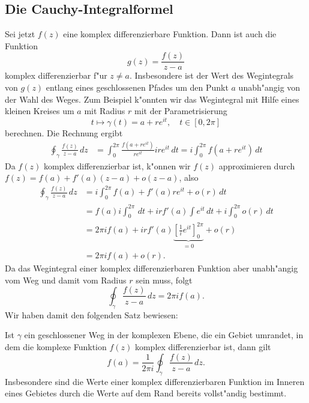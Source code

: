 \subsection{Die Cauchy-Integralformel}
Sei jetzt $f(z)$ eine komplex differenzierbare Funktion.
Dann ist auch die Funktion
\[
g(z)=\frac{f(z)}{z-a}
\]
komplex differenzierbar f"ur $z\ne a$.
Insbesondere ist der Wert des Wegintegrals von $g(z)$ entlang
eines geschlossenen Pfades um den Punkt $a$ unabh"angig von der Wahl
des Weges.
Zum Beispiel k"onnten wir das Wegintegral mit Hilfe eines kleinen Kreises
um $a$ mit Radius $r$ mit der Parametrisierung
\[
t\mapsto \gamma(t)=a+re^{it},\quad t\in[0,2\pi]
\]
berechnen.
Die Rechnung ergibt
\begin{align*}
\oint_\gamma \frac{f(z)}{z-a}\,dz
&=
\int_0^{2\pi} \frac{f(a+re^{it})}{re^{it}}ire^{it}\,dt
=
i\int_0^{2\pi} f(a+re^{it})\,dt
\end{align*}
Da $f(z)$ komplex differenzierbar ist, k"onnen wir $f(z)$ approximieren
durch $f(z)=f(a)+f'(a)(z-a)+o(z-a)$, also
\begin{align*}
\oint_{\gamma} \frac{f(z)}{z-a}\,dz
&=
i\int_0^{2\pi}f(a) + f'(a)re^{it}+o(r)\,dt
\\
&=
f(a)i\int_0^{2\pi}\,dt + irf'(a)\int e^{it}\,dt + i\int_0^{2\pi}o(r)\,dt
\\
&=
2\pi i f(a) + irf'(a)\underbrace{\left[\frac1{i}e^{it}\right]_0^{2\pi}}_{=0}+o(r)
\\
&=2\pi i f(a)+o(r).
\end{align*}
Da das Wegintegral einer komplex differenzierbaren Funktion aber unabh"angig
vom Weg und damit vom Radius $r$ sein muss, folgt
\[
\oint_\gamma \frac{f(z)}{z-a}\,dz=2\pi i f(a).
\]
Wir haben damit den folgenden Satz bewiesen:

\begin{satz}[Cauchy]
Ist $\gamma$ ein geschlossener Weg in der komplexen Ebene, die ein
Gebiet umrandet, in dem die komplexe Funktion $f(z)$ komplex
differenzierbar ist, dann gilt
\[
f(a)=\frac{1}{2\pi i}\oint_{\gamma}\frac{f(z)}{z-a}\,dz.
\]
Insbesondere sind die Werte einer komplex differenzierbaren Funktion 
im Inneren eines Gebietes durch die Werte auf dem Rand bereits vollst"andig
bestimmt.
\end{satz}

